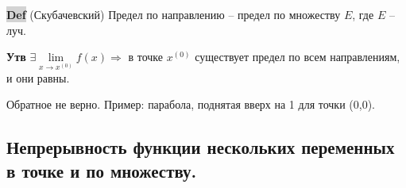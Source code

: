 \documentclass{article}
\newcommand{\bb}{\textbf}
\begin{document}
{\bfseries\colorbox{lightgray}{Def}} (Скубачевский) Предел по направлению -- предел по множеству $E$, где $E$ -- луч.

\bb{Утв} $\exists \lim\limits_{x\to x^{(0)}} f(x) \Rightarrow$ в точке $x^{(0)}$ существует предел по всем направлениям, и они равны.

Обратное не верно. Пример: парабола, поднятая вверх на 1 для точки (0,0).
\newpage
\subsection{Непрерывность функции нескольких переменных в точке и по множеству.}
\begin{figure}[h!]
    \centering
    \vspace{-1cm}
\end{figure}
\begin{figure}[h!]
    \centering
    \vspace{-1cm}
\end{figure}
\begin{figure}[h!]
    \centering
    \vspace{-1cm}
\end{figure}
\begin{figure}[h!]
    \centering
    \vspace{-1cm}
\end{figure}
\end{document}
